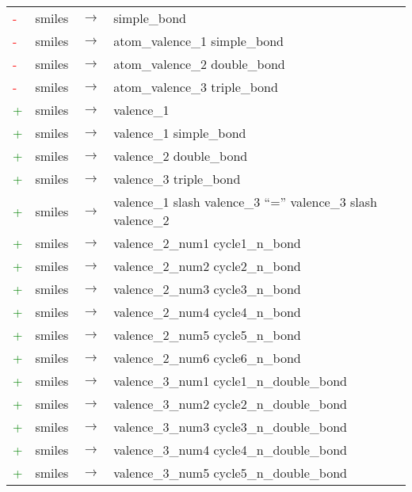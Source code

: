 \footnotesize
\begin{longtable}{m{} m{} p{} p{}}
    \textcolor{red}{-} & smiles & $\rightarrow$ & simple\_bond \\
    \textcolor{red}{-} & smiles & $\rightarrow$ & atom\_valence\_1 simple\_bond \\
    \textcolor{red}{-} & smiles & $\rightarrow$ & atom\_valence\_2 double\_bond \\
    \textcolor{red}{-} & smiles & $\rightarrow$ & atom\_valence\_3 triple\_bond \\
    \textcolor{green}{+} & smiles & $\rightarrow$ & valence\_1 \\
    \textcolor{green}{+} & smiles & $\rightarrow$ & valence\_1 simple\_bond \\
    \textcolor{green}{+} & smiles & $\rightarrow$ & valence\_2 double\_bond \\
    \textcolor{green}{+} & smiles & $\rightarrow$ & valence\_3 triple\_bond \\
    \textcolor{green}{+} & smiles & $\rightarrow$ & valence\_1 slash valence\_3 ``='' valence\_3 slash valence\_2 \\
    \textcolor{green}{+} & smiles & $\rightarrow$ & valence\_2\_num1 cycle1\_n\_bond \\
    \textcolor{green}{+} & smiles & $\rightarrow$ & valence\_2\_num2 cycle2\_n\_bond \\
    \textcolor{green}{+} & smiles & $\rightarrow$ & valence\_2\_num3 cycle3\_n\_bond \\
    \textcolor{green}{+} & smiles & $\rightarrow$ & valence\_2\_num4 cycle4\_n\_bond \\
    \textcolor{green}{+} & smiles & $\rightarrow$ & valence\_2\_num5 cycle5\_n\_bond \\
    \textcolor{green}{+} & smiles & $\rightarrow$ & valence\_2\_num6 cycle6\_n\_bond \\
    \textcolor{green}{+} & smiles & $\rightarrow$ & valence\_3\_num1 cycle1\_n\_double\_bond \\
    \textcolor{green}{+} & smiles & $\rightarrow$ & valence\_3\_num2 cycle2\_n\_double\_bond \\
    \textcolor{green}{+} & smiles & $\rightarrow$ & valence\_3\_num3 cycle3\_n\_double\_bond \\
    \textcolor{green}{+} & smiles & $\rightarrow$ & valence\_3\_num4 cycle4\_n\_double\_bond \\
    \textcolor{green}{+} & smiles & $\rightarrow$ & valence\_3\_num5 cycle5\_n\_double\_bond \\

\end{longtable}
